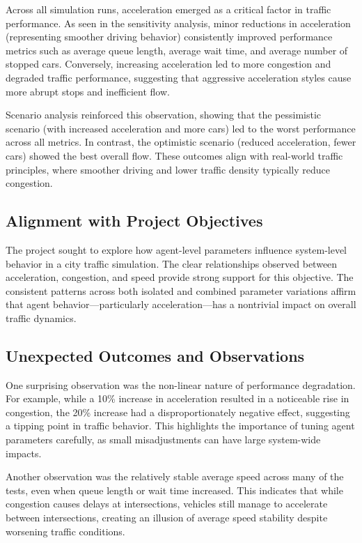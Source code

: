\documentclass[12pt]{article}
\begin{document}
Across all simulation runs, acceleration emerged as a critical factor in traffic performance. As seen in the sensitivity analysis, minor reductions in acceleration (representing smoother driving behavior) consistently improved performance metrics such as average queue length, average wait time, and average number of stopped cars. Conversely, increasing acceleration led to more congestion and degraded traffic performance, suggesting that aggressive acceleration styles cause more abrupt stops and inefficient flow.

Scenario analysis reinforced this observation, showing that the pessimistic scenario (with increased acceleration and more cars) led to the worst performance across all metrics. In contrast, the optimistic scenario (reduced acceleration, fewer cars) showed the best overall flow. These outcomes align with real-world traffic principles, where smoother driving and lower traffic density typically reduce congestion.

\subsection{Alignment with Project Objectives}

The project sought to explore how agent-level parameters influence system-level behavior in a city traffic simulation. The clear relationships observed between acceleration, congestion, and speed provide strong support for this objective. The consistent patterns across both isolated and combined parameter variations affirm that agent behavior—particularly acceleration—has a nontrivial impact on overall traffic dynamics.

\subsection{Unexpected Outcomes and Observations}

One surprising observation was the non-linear nature of performance degradation. For example, while a 10\% increase in acceleration resulted in a noticeable rise in congestion, the 20\% increase had a disproportionately negative effect, suggesting a tipping point in traffic behavior. This highlights the importance of tuning agent parameters carefully, as small misadjustments can have large system-wide impacts.

Another observation was the relatively stable average speed across many of the tests, even when queue length or wait time increased. This indicates that while congestion causes delays at intersections, vehicles still manage to accelerate between intersections, creating an illusion of average speed stability despite worsening traffic conditions.
\end{document}
